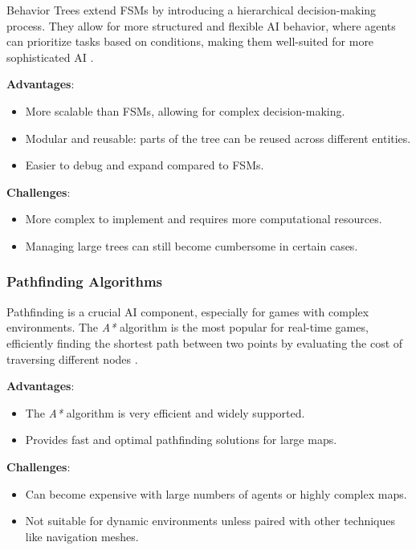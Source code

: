 Behavior Trees extend FSMs by introducing a hierarchical decision-making process.
They allow for more structured and flexible AI behavior,
where agents can prioritize tasks based on conditions,
making them well-suited for more sophisticated AI \cite{Simpson_2023}.

\textbf{Advantages}:
\begin{itemize}
    \item More scalable than FSMs, allowing for complex decision-making.
    \item Modular and reusable: parts of the tree can be reused across different entities.
    \item Easier to debug and expand compared to FSMs.
\end{itemize}

\textbf{Challenges}:
\begin{itemize}
    \item More complex to implement and requires more computational resources.
    \item Managing large trees can still become cumbersome in certain cases.
\end{itemize}

\subsubsection{Pathfinding Algorithms}

Pathfinding is a crucial AI component,
especially for games with complex environments.
The \textit{A*} algorithm is the most popular for real-time games,
efficiently finding the shortest path between two points by evaluating the cost of traversing different nodes \cite{Amit_2024}.

\textbf{Advantages}:
\begin{itemize}
    \item The \textit{A*} algorithm is very efficient and widely supported.
    \item Provides fast and optimal pathfinding solutions for large maps.
\end{itemize}

\textbf{Challenges}:
\begin{itemize}
    \item Can become expensive with large numbers of agents or highly complex maps.
    \item Not suitable for dynamic environments unless paired with other techniques like navigation meshes.
\end{itemize}

